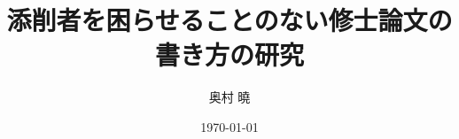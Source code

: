 \documentclass[twoside,openright]{jsbook}
\title{添削者を困らせることのない修士論文の書き方の研究} %
\date{\today} %
\author{奥村 曉} %
\begin{document}
\frontmatter

\maketitle



\tableofcontents
\listoffigures
\listoftables

\mainmatter









\renewcommand{\bibname}{引用文献}


\end{document}
